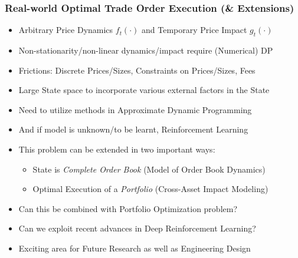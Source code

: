 \documentclass[handout]{beamer}
\begin{document}
\begin{frame}
\frametitle{Real-world Optimal Trade Order Execution (\& Extensions)}
\pause
\begin{itemize}[<+->]
\item Arbitrary Price Dynamics $f_t(\cdot)$ and Temporary Price Impact $g_t(\cdot)$
\item Non-stationarity/non-linear dynamics/impact require (Numerical) DP
\item Frictions: Discrete Prices/Sizes, Constraints on Prices/Sizes, Fees
\item Large State space to incorporate various external factors in the State
\item Need to utilize methods in Approximate Dynamic Programming
\item And if model is unknown/to be learnt, Reinforcement Learning
\item This problem can be extended in two important ways:
\begin{itemize}
\item State is {\em Complete Order Book} (Model of Order Book Dynamics)
\item Optimal Execution of a {\em Portfolio} (Cross-Asset Impact Modeling)
\end{itemize}
\item Can this be combined with Portfolio Optimization problem?
\item Can we exploit recent advances in Deep Reinforcement Learning?
\item Exciting area for Future Research as well as Engineering Design
\end{itemize}
\end{frame}
\end{document}

